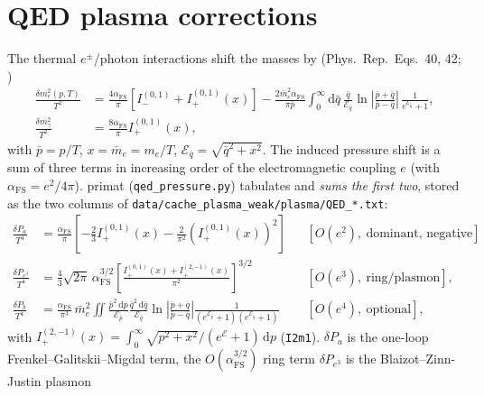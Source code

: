 \documentclass[11pt,a4paper]{article}
\newcommand{\dd}{\mathrm{d}}
\newcommand{\code}[1]{\texttt{#1}}
\newcommand{\PR}{Phys.\ Rep.}
\newcommand{\afs}{\alpha_{\mathrm{FS}}}
\begin{document}
\section{QED plasma corrections}\label{app:qed}
The thermal $e^\pm$/photon interactions shift the masses by (\PR\ Eqs.~40, 42;
\cite{Mangano2001,LopezTurner1998})
\begin{equation}
\begin{aligned}
  \frac{\delta m_e^2(p,T)}{T^2} &= \frac{4\afs}{\pi}\left[I^{(0,1)}_- + I^{(0,1)}_+(x)\right]
     - \frac{2\bar m_e^2\afs}{\pi\bar p}\!\int_0^\infty\!\dd\bar q\,
       \frac{\bar q}{\mathcal{E}_{\bar q}}
       \ln\!\left|\frac{\bar p+\bar q}{\bar p-\bar q}\right|\,
       \frac{1}{e^{\mathcal{E}_{\bar q}}+1},\\
  \frac{\delta m_\gamma^2}{T^2} &= \frac{8\afs}{\pi}I^{(0,1)}_+(x),
\end{aligned}
\end{equation}
with $\bar p=p/T$, $x=\bar m_e=m_e/T$, $\mathcal{E}_{\bar q}=\sqrt{\bar q^2+x^2}$.
The induced pressure shift is a sum of three terms in increasing order of the
electromagnetic coupling $e$ (with $\afs=e^2/4\pi$). primat
(\code{qed\_pressure.py}) tabulates and \emph{sums the first two}, stored as the
two columns of \code{data/cache\_plasma\_weak/plasma/QED\_*.txt}:
\begin{align}
  \frac{\delta P_a}{T^4} &= \frac{\afs}{\pi}\!\left[
     -\frac{2}{3}I^{(0,1)}_+(x) - \frac{2}{\pi^2}\left(I^{(0,1)}_+(x)\right)^2\right]
     && [O(e^2),\ \text{dominant, negative}],\\
  \frac{\delta P_{e^3}}{T^4} &= \frac{4}{3}\sqrt{2\pi}\,\afs^{3/2}
     \left[\frac{I^{(0,1)}_+(x)+I^{(2,-1)}_+(x)}{\pi^2}\right]^{3/2}
     && [O(e^3),\ \text{ring/plasmon}],\\
  \frac{\delta P_b}{T^4} &= \frac{\afs}{\pi^3}\,\bar m_e^2\!
     \iint\!\frac{\bar p^2\,\dd\bar p}{\mathcal{E}_{\bar p}}
     \frac{\bar q^2\,\dd\bar q}{\mathcal{E}_{\bar q}}
     \ln\!\left|\frac{\bar p+\bar q}{\bar p-\bar q}\right|
     \frac{1}{(e^{\mathcal{E}_{\bar p}}+1)(e^{\mathcal{E}_{\bar q}}+1)}
     && [O(e^4),\ \text{optional}],
\end{align}
with $I^{(2,-1)}_+(x)=\int_0^\infty\!\sqrt{p^2+x^2}/(e^{\mathcal{E}}+1)\,\dd p$
(\code{I2m1}). $\delta P_a$ is the one-loop Frenkel--Galitskii--Migdal term, the
$O(\afs^{3/2})$ ring term $\delta P_{e^3}$ is the Blaizot--Zinn-Justin plasmon
\end{document}
